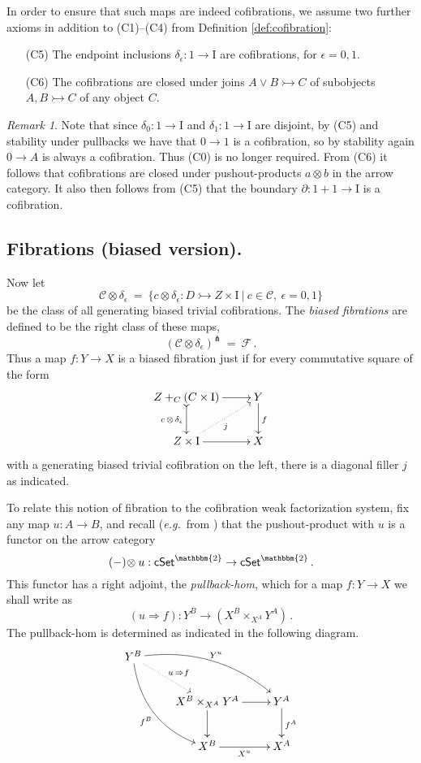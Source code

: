 \documentclass[11pt,reqno]{amsart}
\newcommand{\eg}{\emph{e.g.}}
\newcommand{\cSet}{\ensuremath{\mathsf{cSet}}}
\newcommand{\mono}{\ensuremath{\rightarrowtail}}
\newcommand{\ra}{\ensuremath{\rightarrow}}
\renewcommand{\to}{\ensuremath{\rightarrow}}
\newcommand{\too}{\ensuremath{\longrightarrow}}
\newcommand{\I}{\ensuremath{\mathrm{I}}}
\newcommand{\del}{\ensuremath{\partial}}
\theoremstyle{remark}
\newtheorem{remark}[theorem]{Remark}
\theoremstyle{definition}
\begin{document}
In order to ensure that such maps are indeed cofibrations, we assume two further axioms in addition to (C1)--(C4) from Definition \ref{def:cofibration}:
\begin{enumerate}\label{cofibration_axioms}
\item[(C5)] The endpoint inclusions $\delta_\epsilon : 1 \ra \I$ are cofibrations, for $\epsilon = 0,1$.
\item[(C6)] The cofibrations are closed under joins $A\vee B \mono C$ of subobjects $A, B \mono C$ of any object $C$.
\end{enumerate}
%
\begin{remark}\label{rem:somecofibs}
Note that since $\delta_0: 1\to\I$ and $\delta_1:1\to\I$ are disjoint, by (C5) and stability under pullbacks we have that $0 \ra 1$ is a cofibration, so by stability again $0\ra A$ is always a cofibration.  Thus (C0) is no longer required.  From (C6) it follows that cofibrations are closed under pushout-products ${a}\otimes{b}$ in the arrow category.  It also then follows from (C5) that the boundary $\del : 1+1 \to \I$ is a cofibration.
\end{remark}

\subsection*{Fibrations (biased version).}
Now let 
\[
\mathcal{C}\otimes \delta_\epsilon\ =\ \{ c \otimes \delta_\epsilon : D \mono Z \times \I\ |\ c \in\mathcal{C},\ \epsilon = 0,1 \}
\]
be the class of all generating biased trivial cofibrations.
The \emph{biased fibrations} are defined to be the right class of these maps,
\[
(\mathcal{C}\otimes \delta_\epsilon)^\pitchfork\ =\ \mathcal{F}\,.
\]
Thus a map $f : Y\ra X$ is a biased fibration just if for every commutative square of the form
\begin{equation}\label{diagram:biasedfillers}
\xymatrix{
Z +_C (C\times\I) \ar@{>->}[d]_{c\, \otimes\, \delta_\epsilon} \ar[r] & Y \ar[d]^f \\
Z\times \I \ar@{.>}[ru]_{j} \ar[r] & X
}
\end{equation}
with a generating biased trivial cofibration on the left, there is a diagonal filler $j$ as indicated. 

To relate this notion of fibration to the cofibration weak factorization system, fix any map $u : A \ra B$, and recall (\eg\ from \cite{JT:notes,Riehl}) that the pushout-product with $u$ is a functor on the arrow category 
\[
(-)\!\otimes u : \cSet^\mathbbm{2} \ra\cSet^\mathbbm{2}\,.
\]
This functor has a right adjoint, the \emph{pullback-hom}, which for a map $f : Y\ra X$ we shall write as
\[
(u \Rightarrow\! f) : Y^B \too (X^B \times_{X^A} Y^A) \,.
\]
The pullback-hom is determined as indicated in the following diagram.
\begin{equation}\label{diagram:pullbackhom}
\xymatrix{
Y^B \ar@/_4ex/[rdd]_{f^B} \ar@{.>}[rd]^{u\, \Rightarrow f} \ar@/^4ex/ [rrd]^{Y^u} && \\
& X^B \times_{X^A} Y^A \ar[d] \ar[r] & Y^A \ar[d]^{f^A} \\
& X^B \ar[r]_{X^u} &  X^A 
}
\end{equation}
\end{document}
